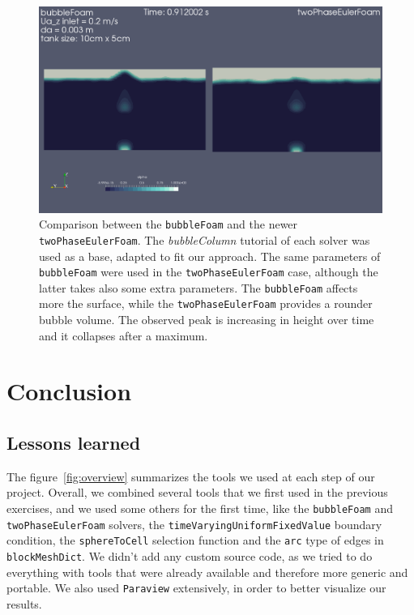 \documentclass[11pt, a4paper, twoside]{article}
\begin{document}
\begin{figure}
    \centering
    \includegraphics[width=\textwidth]{figures/bubbleFoam_vs_twoPhaseEulerFoam}
    \caption{Comparison between the \texttt{bubbleFoam} and the newer \texttt{twoPhaseEulerFoam}. The \emph{bubbleColumn} tutorial of each solver was used as a base, adapted to fit our approach. The same parameters of \texttt{bubbleFoam} were used in the \texttt{twoPhaseEulerFoam} case, although the latter takes also some extra parameters. The \texttt{bubbleFoam} affects more the surface, while the \texttt{twoPhaseEulerFoam} provides a rounder bubble volume. The observed peak is increasing in height over time and it collapses after a maximum.}
    \label{fig:twoPhaseEulerFoam}
\end{figure}

\section{Conclusion}

\subsection{Lessons learned}
The figure~\ref{fig:overview} summarizes the tools we used at each step of our project. Overall, we combined several tools that we first used in the previous exercises, and we used some others for the first time, like the \texttt{bubbleFoam} and \texttt{twoPhaseEulerFoam} solvers, the \texttt{timeVaryingUniformFixedValue} boundary condition, the \texttt{sphereToCell} selection function and the \texttt{arc} type of edges in \texttt{blockMeshDict}. We didn't add any custom source code, as we tried to do everything with tools that were already available and therefore more generic and portable. We also used \texttt{Paraview} extensively, in order to better visualize our results.
\end{document}
